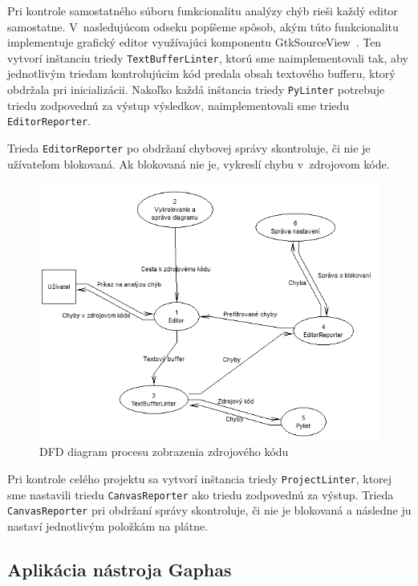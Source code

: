 \documentclass[11pt,oneside,final]{fithesis2}
\begin{document}
		Pri kontrole samostatného súboru funkcionalitu analýzy chýb rieši každý editor samostatne. V~nasledujúcom odseku popíšeme spôsob, akým túto funkcionalitu implementuje grafický editor využívajúci komponentu GtkSourceView~\cite{gtksourceview}. Ten vytvorí inštanciu triedy \texttt{TextBufferLinter}, ktorú sme naimplementovali tak, aby jednotlivým triedam kontrolujúcim kód predala obsah textového bufferu, ktorý obdržala pri inicializácii. Nakoľko každá inštancia triedy \texttt{PyLinter} potrebuje triedu zodpovednú za výstup výsledkov, naimplementovali sme triedu \texttt{EditorReporter}.
		
		Trieda \texttt{EditorReporter} po obdržaní chybovej správy skontroluje, či nie je užívateľom blokovaná. Ak blokovaná nie je, vykreslí chybu v~zdrojovom kóde.

	
	\begin{figure}[htb]
	 \centering
	 \includegraphics[width=\textwidth]{images/dfd_editor}
	 \caption{DFD diagram procesu zobrazenia zdrojového kódu}
	\end{figure}

		
	Pri kontrole celého projektu sa vytvorí inštancia triedy \texttt{ProjectLinter}, ktorej sme nastavili triedu \texttt{CanvasReporter} ako triedu zodpovednú za výstup. Trieda \texttt{CanvasReporter} pri obdržaní správy skontroluje, či nie je blokovaná a následne ju nastaví jednotlivým položkám na plátne.
 
		\subsection{Aplikácia nástroja Gaphas}
		
\end{document}
